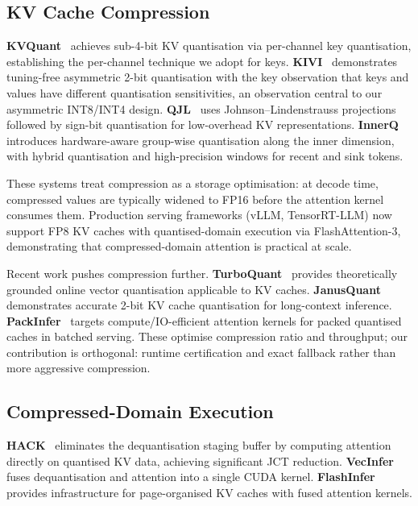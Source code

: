 \documentclass[11pt,a4paper]{article}
\theoremstyle{definition}
\theoremstyle{remark}
\begin{document}
\subsection{KV Cache Compression}

\textbf{KVQuant}~\cite{kvquant} achieves sub-4-bit KV quantisation via per-channel key quantisation, establishing the per-channel technique we adopt for keys.  \textbf{KIVI}~\cite{kivi} demonstrates tuning-free asymmetric 2-bit quantisation with the key observation that keys and values have different quantisation sensitivities, an observation central to our asymmetric INT8/INT4 design.  \textbf{QJL}~\cite{qjl} uses Johnson--Lindenstrauss projections followed by sign-bit quantisation for low-overhead KV representations.  \textbf{InnerQ}~\cite{innerq} introduces hardware-aware group-wise quantisation along the inner dimension, with hybrid quantisation and high-precision windows for recent and sink tokens.

These systems treat compression as a storage optimisation: at decode time, compressed values are typically widened to FP16 before the attention kernel consumes them.  Production serving frameworks (vLLM, TensorRT-LLM) now support FP8 KV caches with quantised-domain execution via FlashAttention-3, demonstrating that compressed-domain attention is practical at scale.

Recent work pushes compression further.  \textbf{TurboQuant}~\cite{turboquant} provides theoretically grounded online vector quantisation applicable to KV caches.  \textbf{JanusQuant}~\cite{janusquant} demonstrates accurate 2-bit KV cache quantisation for long-context inference.  \textbf{PackInfer}~\cite{packinfer} targets compute/IO-efficient attention kernels for packed quantised caches in batched serving.  These optimise compression ratio and throughput; our contribution is orthogonal: runtime certification and exact fallback rather than more aggressive compression.

\subsection{Compressed-Domain Execution}

\textbf{HACK}~\cite{hack} eliminates the dequantisation staging buffer by computing attention directly on quantised KV data, achieving significant JCT reduction.  \textbf{VecInfer}~\cite{vecinfer} fuses dequantisation and attention into a single CUDA kernel.  \textbf{FlashInfer}~\cite{flashinfer} provides infrastructure for page-organised KV caches with fused attention kernels.
\end{document}
